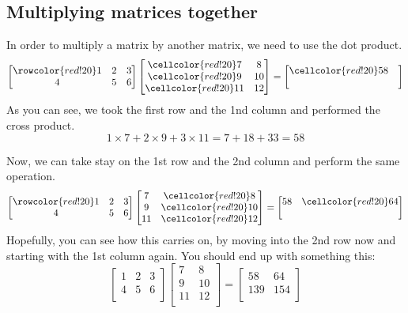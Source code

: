 \documentclass[table]{article}
\theoremstyle{definition}
\begin{document}
  \subsection{Multiplying matrices together}
  In order to multiply a matrix by another matrix, we need to use the dot product.
\[
    \begin{bmatrix}
      \rowcolor{red!20}
      1 & 2 & 3 \\
      4 & 5 & 6 \\
    \end{bmatrix}
    \begin{bmatrix}
      \cellcolor{red!20} 7 & 8 \\
      \cellcolor{red!20}9 & 10 \\
      \cellcolor{red!20}11 & 12 \\
    \end{bmatrix}
    = \begin{bmatrix}
      \cellcolor{red!20}58 &  \\
       &  \\
    \end{bmatrix}
  \]
  As you can see, we took the first row and the 1nd column and performed the cross product. 
  \[1\times 7 + 2 \times 9 + 3 \times 11 = 7 + 18 + 33 = 58\]

  Now, we can take stay on the 1st row and the 2nd column and perform the same operation.
\[
    \begin{bmatrix}
      \rowcolor{red!20}
      1 & 2 & 3 \\
      4 & 5 & 6 \\
    \end{bmatrix}
    \begin{bmatrix}
       7 &\cellcolor{red!20} 8 \\
      9 &\cellcolor{red!20} 10 \\
      11 & \cellcolor{red!20}12 \\
    \end{bmatrix}
    = \begin{bmatrix}
      58 & \cellcolor{red!20}64 \\
       &  \\
    \end{bmatrix}
  \]
  Hopefully, you can see how this carries on, by moving into the 2nd row now and starting with the 1st column again. You should end up with something this:
  \[
    \begin{bmatrix}
      1 & 2 & 3 \\
      4 & 5 & 6 \\
    \end{bmatrix}
    \begin{bmatrix}
       7 & 8 \\
      9 & 10 \\
      11 & 12 \\
    \end{bmatrix}
    = \begin{bmatrix}
      58 & 64 \\
      139 & 154  \\
    \end{bmatrix}
  \] 
\end{document}
